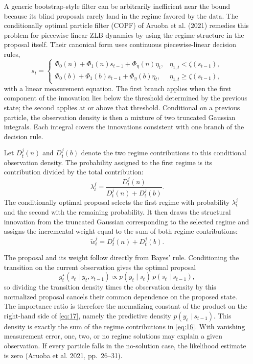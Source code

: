 \documentclass[11pt]{article}
\begin{document}
A generic bootstrap-style filter can be arbitrarily inefficient near the
bound because its blind proposals rarely land in the regime favored by the
data. The conditionally optimal particle filter (COPF) of Aruoba et al.
(2021) remedies this problem for piecewise-linear
ZLB dynamics by using the regime structure in the proposal itself. Their
canonical form uses continuous piecewise-linear decision rules,
\begin{equation}\label{eq:14}
 s_t=
 \begin{cases}
 \Phi_0(n)+\Phi_1(n)s_{t-1}+\Phi_\eta(n)\eta_t,&
 \eta_{1,t}<\zeta(s_{t-1}),\\[2pt]
 \Phi_0(b)+\Phi_1(b)s_{t-1}+\Phi_\eta(b)\eta_t,&
 \eta_{1,t}\geq\zeta(s_{t-1}),
 \end{cases}
\end{equation}
with a linear measurement equation. The first branch applies when the first
component of the innovation lies below the threshold determined by the
previous state; the second applies at or above that threshold. Conditional
on a previous particle, the observation density is then a mixture of two
truncated Gaussian integrals. Each integral covers the innovations
consistent with one branch of the decision rule.

Let $D_t^j(n)$ and
$D_t^j(b)$ denote the two regime contributions to
this conditional observation density. The probability assigned to the first
regime is its contribution divided by the total contribution:
\begin{equation}\label{eq:15}
 \lambda_t^j=\frac{D_t^j(n)}{D_t^j(n)+D_t^j(b)}.
\end{equation}
The conditionally optimal proposal selects the first regime with probability
$\lambda_t^j$ and the second with the remaining
probability. It then draws the structural innovation from the truncated
Gaussian corresponding to the selected regime and assigns the incremental
weight equal to the sum of both regime contributions:
\begin{equation}\label{eq:16}
 \widetilde w_t^j=D_t^j(n)+D_t^j(b).
\end{equation}

The proposal and its weight follow directly from Bayes' rule. Conditioning
the transition on the current observation gives the optimal proposal
\begin{equation}\label{eq:17}
 g_t^\star(s_t\mid y_t,s_{t-1})
 \propto p(y_t\mid s_t)\,p(s_t\mid s_{t-1}),
\end{equation}
so dividing the transition density times the observation density by this
normalized proposal cancels their common dependence on the proposed state.
The importance ratio is therefore the normalizing constant of the product
on the right-hand side of \eqref{eq:17}, namely the
predictive density $p(y_t\mid s_{t-1})$. This density is exactly
the sum of the regime contributions in
\eqref{eq:16}. With vanishing measurement error, one,
two, or no regime solutions may explain a given observation. If every
particle falls in the no-solution case, the likelihood estimate is zero
(Aruoba et al. 2021,
pp.~26--31).
\end{document}
